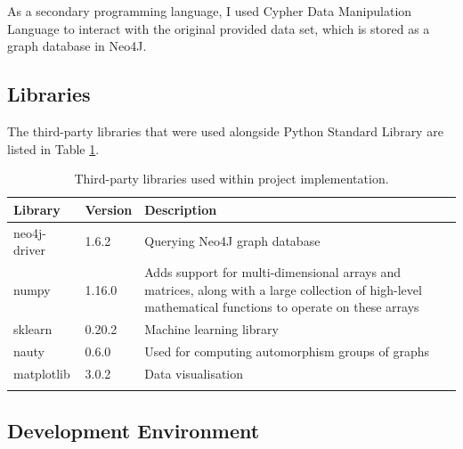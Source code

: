 As a secondary programming language, I used Cypher Data Manipulation Language to interact with the original provided data set, which is stored as a graph database in Neo4J.

\subsection{Libraries}

The third-party libraries that were used alongside Python Standard Library are listed in Table \ref{Libraries}. \bigskip

\begin{longtable}{|p{}|p{}|p{}|}
  \hline
  \textbf{Library} & \textbf{Version} & \textbf{Description}                                                                                                                                  \\
  \hline
  neo4j-driver     & 1.6.2            & Querying Neo4J graph database                                                                                                                         \\

  numpy            & 1.16.0           & Adds support for multi-dimensional arrays and matrices, along with a large collection of high-level mathematical functions to operate on these arrays \\

  sklearn          & 0.20.2           & Machine learning library                                                                                                                              \\

  nauty            & 0.6.0            & Used for computing automorphism groups of graphs                                                                                                      \\

  matplotlib       & 3.0.2            & Data visualisation                                                                                                                                    \\


  \hline
  \caption[Libraries]{Third-party libraries used within project implementation.}
  \label{Libraries}
\end{longtable} \bigskip

\subsection{Development Environment}

